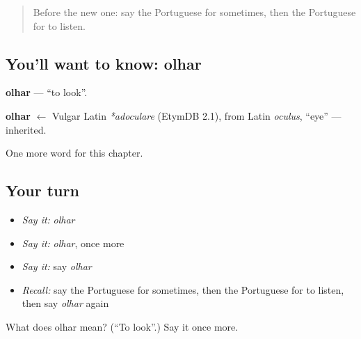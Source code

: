 \label{lesson:PT-C129-olhar}



\begin{quote}
Before the new one: say the Portuguese for sometimes, then the Portuguese for to listen.
\end{quote}

\subsection*{You'll want to know: olhar}
\textbf{olhar} — \textquotedblleft{}to look\textquotedblright{}.

\begin{cousinweb}
\textbf{olhar} $\leftarrow$ Vulgar Latin \emph{*adoculare} (EtymDB 2.1), from Latin \emph{oculus}, \textquotedblleft{}eye\textquotedblright{} — inherited.
\end{cousinweb}

\begin{grammarlens}[title={What you've built}]
One more word for this chapter.
\end{grammarlens}

\subsection*{Your turn}
\begin{itemize}
\raggedright
  \item \emph{Say it:} \emph{olhar}
  \item \emph{Say it:} \emph{olhar}, once more
  \item \emph{Say it:} say \emph{olhar}
  \item \emph{Recall:} say the Portuguese for sometimes, then the Portuguese for to listen, then say \emph{olhar} again
\end{itemize}

\begin{tcolorbox}[breakable,colback=teal!4,colframe=teal!35!black,title={Before you move on}]
What does olhar mean? (\textquotedblleft{}To look\textquotedblright{}.) Say it once more.
\end{tcolorbox}
